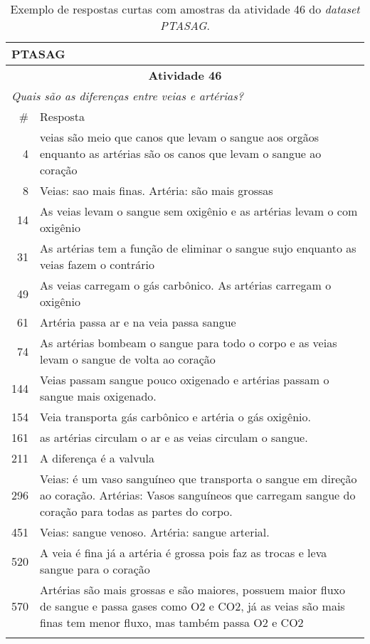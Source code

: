 \begin{table}[!b]
\centering
\caption{Exemplo de respostas curtas com amostras da atividade 46 do \textit{dataset PTASAG}.}
\label{tab-ptasag46-exemplo}
\begin{tabular}{ r | p{12cm}}
\hline
\multicolumn{2}{l}{\textbf{PTASAG}} \\ \hline
\multicolumn{2}{c}{\textbf{Atividade 46}} \\ \hline 
\multicolumn{2}{l}{\textit{Quais são as diferenças entre veias e artérias?}} \\ \hline
 \# & Resposta \\ \hline
 4 & veias são meio que canos que levam o sangue aos orgãos enquanto as artérias são os canos que levam o sangue ao coração \\
 8 & Veias: sao mais finas. Artéria: são mais grossas \\
 14 & As veias levam o sangue sem oxigênio e as artérias levam o com oxigênio \\
 31 & As artérias tem a função de eliminar o sangue sujo enquanto as veias fazem o contrário \\
 49 & As veias carregam o gás carbônico. As artérias carregam o oxigênio \\
 61 & Artéria passa ar e na veia passa sangue \\
 74  & As artérias bombeam o sangue para todo o corpo e as veias levam o sangue de volta ao coração \\
 144 & Veias passam sangue pouco oxigenado e artérias passam o sangue mais oxigenado. \\
 154 & Veia transporta gás carbônico e artéria o gás oxigênio. \\
 161 & as artérias circulam o ar e as veias circulam o sangue. \\
 211 & A diferença é a valvula \\
 296 & Veias: é um vaso sanguíneo que transporta o sangue em direção ao coração. Artérias: Vasos sanguíneos que carregam sangue do coração para todas as partes do corpo. \\
 451 & Veias: sangue venoso. Artéria: sangue arterial. \\
 520 & A veia é fina já a artéria é grossa pois faz as trocas e leva sangue para o coração \\ 
 570 &  Artérias são mais grossas e são maiores, possuem maior fluxo de sangue e passa gases como O2 e CO2, já as veias são mais finas tem menor fluxo, mas também passa O2 e CO2 \\
\\
\hline
\hline
\end{tabular}
\end{table}


